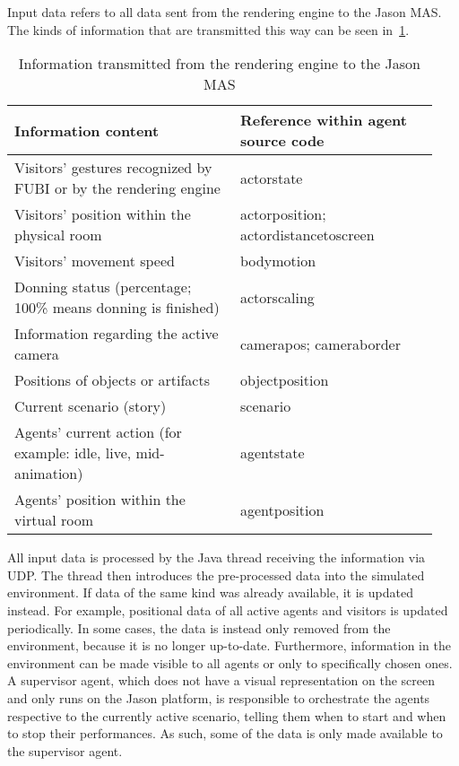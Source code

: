 \documentclass[draft,final]{vutinfth} %
\begin{document}
Input data refers to all data sent from the rendering engine to the Jason MAS. 
The kinds of information that are transmitted this way can be seen in~\ref{tab:jason_input}.
\begin{table}
	\begin{tabular}{p{0.5\linewidth}|p{0.44\linewidth}}
		\toprule
		Information content & Reference within agent source code  \\
		\midrule
		Visitors’ gestures recognized by FUBI or by the rendering engine	& actorstate \\ %
		Visitors’ position within the physical room							& actorposition; actordistancetoscreen \\ %
		Visitors’ movement speed											& bodymotion \\ %
		Donning status (percentage; 100\% means donning is finished)		& actorscaling \\ %
		Information regarding the active camera								& camerapos; cameraborder \\ %
		Positions of objects or artifacts									& objectposition \\ %
		Current scenario (story)											& scenario \\ %
		Agents’ current action (for example: idle, live, mid-animation)		& agentstate \\ %
		Agents’ position within the virtual room							& agentposition \\ %
		\bottomrule
	\end{tabular}
	\caption{Information transmitted from the rendering engine to the Jason MAS}
	\label{tab:jason_input}
\end{table}
All input data is processed by the Java thread receiving the information via UDP. 
The thread then introduces the pre-processed data into the simulated environment. 
If data of the same kind was already available, it is updated instead. 
For example, positional data of all active agents and visitors is updated periodically. 
In some cases, the data is instead only removed from the environment, because it is no longer up-to-date. 
Furthermore, information in the environment can be made visible to all agents or only to specifically chosen ones. 
A supervisor agent, which does not have a visual representation on the screen and only runs on the Jason platform, is responsible to orchestrate the agents respective to the currently active scenario, telling them when to start and when to stop their performances. 
As such, some of the data is only made available to the supervisor agent. \\
\end{document}
